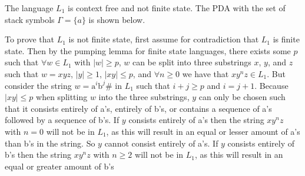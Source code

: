 \documentclass[12pt]{article}
\begin{document}
The language \(L_1\) is context free and not finite state. The PDA with the set of stack symbols \(\Gamma = \{a\}\) is shown below.
\begin{center}
\end{center}
To prove that \(L_1\) is not finite state, first assume for contradiction that \(L_1\) is finite state. Then by the pumping lemma for finite state languages,
there exists some \(p\) such that \(\forall w\in L_1\) with \(|w|\geq p\), \(w\) can be split into three substrings \(x\), \(y\), and \(z\) such that \(w=xyz\),
\(|y|\geq 1\), \(|xy|\leq p\), and \(\forall n\geq 0\) we have that \(xy^nz\in L_1\). But consider the string \(w=\text{a}^i\text{b}^j\text{\#}\) in \(L_1\)
such that \(i+j\geq p\) and \(i=j+1\). Because \(|xy|\leq p\) when splitting \(w\) into the three substrings, \(y\) can only be chosen such that it consists
entirely of a's, entirely of b's, or contains a sequence of a's followed by a sequence of b's. If \(y\) consists entirely of a's then the string \(xy^nz\)
with \(n=0\) will not be in \(L_1\), as this will result in an equal or lesser amount of a's than b's in the string. So \(y\) cannot consist entirely of a's.
If \(y\) consists entirely of b's then the string \(xy^nz\) with \(n\geq 2\) will not be in \(L_1\), as this will result in an equal or greater amount of b's
\end{document}
